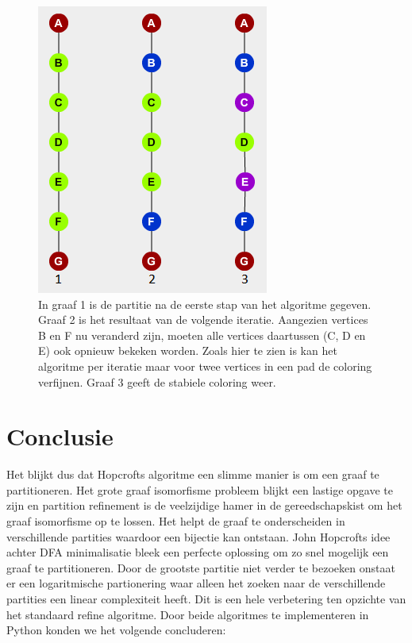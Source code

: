 \documentclass[twoside]{article}
\begin{document}
\begin{multicols}{2}
\begin{figure}[H]
\centering
\includegraphics[]{paths.png}
\caption{In graaf 1 is de partitie na de eerste stap van het algoritme gegeven. Graaf 2 is het resultaat van de volgende iteratie. Aangezien vertices B en F nu veranderd zijn, moeten alle vertices daartussen (C, D en E) ook opnieuw bekeken worden. Zoals hier te zien is kan het algoritme per iteratie maar voor twee vertices in een pad de coloring verfijnen. Graaf 3 geeft de stabiele coloring weer. \label{paths}}
\end{figure}


\section{Conclusie}
Het blijkt dus dat Hopcrofts algoritme een slimme manier is om een graaf te partitioneren. Het grote graaf isomorfisme probleem blijkt een lastige opgave te zijn en partition refinement is de veelzijdige hamer in de gereedschapskist om het graaf isomorfisme op te lossen. Het helpt de graaf te onderscheiden in verschillende partities waardoor een bijectie kan ontstaan. John Hopcrofts idee achter DFA minimalisatie bleek een perfecte oplossing om zo snel mogelijk een graaf te partitioneren. Door de grootste partitie niet verder te bezoeken onstaat er een logaritmische partionering waar alleen het zoeken naar de verschillende partities een linear complexiteit heeft. Dit is een hele verbetering ten opzichte van het standaard refine algoritme. Door beide algoritmes te implementeren in Python konden we het volgende concluderen:


\end{multicols}
\end{document}
